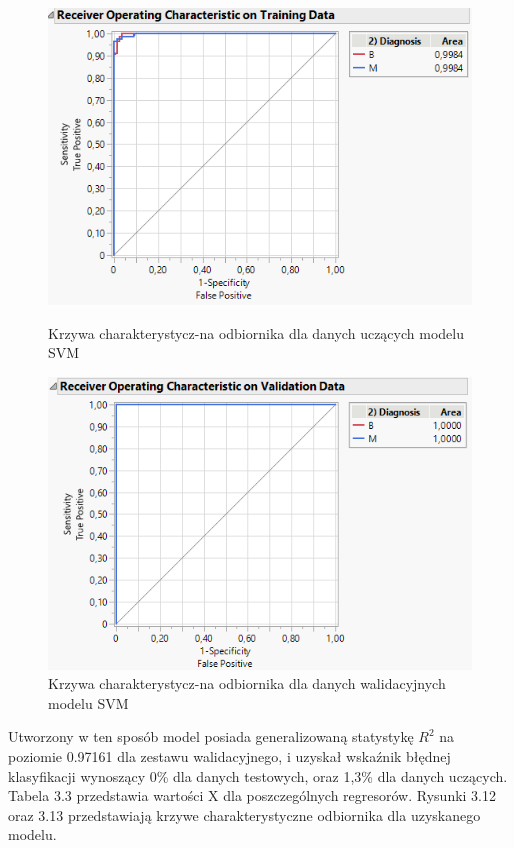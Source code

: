 \begin{figure}[!ht]
	\begin{minipage}{0.48\textwidth}
		\centering
		\includegraphics[width=0.98\linewidth]{Rozdzial3/roc_svm1_test}
		\caption{Krzywa charakterystycz-na odbiornika dla danych uczących modelu SVM}
		\label{fig:rocsvm1test}		
	\end{minipage}%
	\hspace{10pt}
	\begin{minipage}{0.48\textwidth}
		\centering
		\includegraphics[width=0.98\linewidth]{Rozdzial3/roc_svm1_val}
		\caption{Krzywa charakterystycz-na odbiornika dla danych walidacyjnych modelu SVM}
		\label{fig:rocsvm1val}				
	\end{minipage}	
\end{figure}

Utworzony w ten sposób model posiada generalizowaną statystykę $R^{2}$ na poziomie 0.97161 dla zestawu walidacyjnego, i uzyskał wskaźnik błędnej klasyfikacji wynoszący 0\% dla danych testowych, oraz 1,3\% dla danych uczących. Tabela 3.3 przedstawia wartości X dla poszczególnych regresorów. Rysunki 3.12 oraz 3.13 przedstawiają krzywe charakterystyczne odbiornika dla uzyskanego modelu.